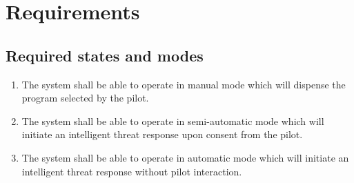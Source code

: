 \documentclass[Main]{subfiles}
\begin{document}
\setcounter{chapter}{2}
\chapter{Requirements}

\section{Required states and modes}

\begin{enumerate}[{SR}-1]
\setcounter{enumi}{0}
\item The system shall be able to operate in manual mode which will dispense the program selected by the pilot.\label{SR-1}

\item The system shall be able to operate in semi-automatic mode which will initiate an intelligent threat response upon consent from the pilot.\label{SR-2}

\item The system shall be able to operate in automatic mode which will initiate an intelligent threat response without pilot interaction.\label{SR-3}


\end{enumerate}
\end{document}
